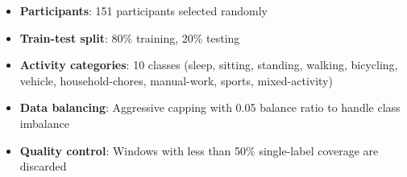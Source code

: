 \begin{itemize}
    \item \textbf{Participants}: 151 participants selected randomly
    \item \textbf{Train-test split}: 80\% training, 20\% testing
    \item \textbf{Activity categories}: 10 classes (sleep, sitting, standing, walking, bicycling, vehicle, household-chores, manual-work, sports, mixed-activity)
    \item \textbf{Data balancing}: Aggressive capping with 0.05 balance ratio to handle class imbalance
    \item \textbf{Quality control}: Windows with less than 50\% single-label coverage are discarded
\end{itemize}
